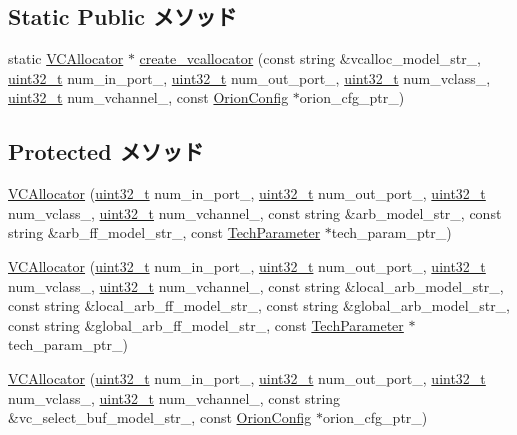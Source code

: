 \subsection*{Static Public メソッド}
\begin{DoxyCompactItemize}
\item 
static \hyperlink{classVCAllocator}{VCAllocator} $\ast$ \hyperlink{classVCAllocator_a745bd92fa44e4cfb30420743174c318d}{create\_\-vcallocator} (const string \&vcalloc\_\-model\_\-str\_\-, \hyperlink{Type_8hh_a435d1572bf3f880d55459d9805097f62}{uint32\_\-t} num\_\-in\_\-port\_\-, \hyperlink{Type_8hh_a435d1572bf3f880d55459d9805097f62}{uint32\_\-t} num\_\-out\_\-port\_\-, \hyperlink{Type_8hh_a435d1572bf3f880d55459d9805097f62}{uint32\_\-t} num\_\-vclass\_\-, \hyperlink{Type_8hh_a435d1572bf3f880d55459d9805097f62}{uint32\_\-t} num\_\-vchannel\_\-, const \hyperlink{classOrionConfig}{OrionConfig} $\ast$orion\_\-cfg\_\-ptr\_\-)
\end{DoxyCompactItemize}
\subsection*{Protected メソッド}
\begin{DoxyCompactItemize}
\item 
\hyperlink{classVCAllocator_aecc1c32dc5dcfb2f4cb618d6f3a56c16}{VCAllocator} (\hyperlink{Type_8hh_a435d1572bf3f880d55459d9805097f62}{uint32\_\-t} num\_\-in\_\-port\_\-, \hyperlink{Type_8hh_a435d1572bf3f880d55459d9805097f62}{uint32\_\-t} num\_\-out\_\-port\_\-, \hyperlink{Type_8hh_a435d1572bf3f880d55459d9805097f62}{uint32\_\-t} num\_\-vclass\_\-, \hyperlink{Type_8hh_a435d1572bf3f880d55459d9805097f62}{uint32\_\-t} num\_\-vchannel\_\-, const string \&arb\_\-model\_\-str\_\-, const string \&arb\_\-ff\_\-model\_\-str\_\-, const \hyperlink{classTechParameter}{TechParameter} $\ast$tech\_\-param\_\-ptr\_\-)
\item 
\hyperlink{classVCAllocator_a5b05efc72373929d96a89a3fd24feb6e}{VCAllocator} (\hyperlink{Type_8hh_a435d1572bf3f880d55459d9805097f62}{uint32\_\-t} num\_\-in\_\-port\_\-, \hyperlink{Type_8hh_a435d1572bf3f880d55459d9805097f62}{uint32\_\-t} num\_\-out\_\-port\_\-, \hyperlink{Type_8hh_a435d1572bf3f880d55459d9805097f62}{uint32\_\-t} num\_\-vclass\_\-, \hyperlink{Type_8hh_a435d1572bf3f880d55459d9805097f62}{uint32\_\-t} num\_\-vchannel\_\-, const string \&local\_\-arb\_\-model\_\-str\_\-, const string \&local\_\-arb\_\-ff\_\-model\_\-str\_\-, const string \&global\_\-arb\_\-model\_\-str\_\-, const string \&global\_\-arb\_\-ff\_\-model\_\-str\_\-, const \hyperlink{classTechParameter}{TechParameter} $\ast$tech\_\-param\_\-ptr\_\-)
\item 
\hyperlink{classVCAllocator_a0b2080a0d054daf29949a238a93fe76e}{VCAllocator} (\hyperlink{Type_8hh_a435d1572bf3f880d55459d9805097f62}{uint32\_\-t} num\_\-in\_\-port\_\-, \hyperlink{Type_8hh_a435d1572bf3f880d55459d9805097f62}{uint32\_\-t} num\_\-out\_\-port\_\-, \hyperlink{Type_8hh_a435d1572bf3f880d55459d9805097f62}{uint32\_\-t} num\_\-vclass\_\-, \hyperlink{Type_8hh_a435d1572bf3f880d55459d9805097f62}{uint32\_\-t} num\_\-vchannel\_\-, const string \&vc\_\-select\_\-buf\_\-model\_\-str\_\-, const \hyperlink{classOrionConfig}{OrionConfig} $\ast$orion\_\-cfg\_\-ptr\_\-)
\end{DoxyCompactItemize}
